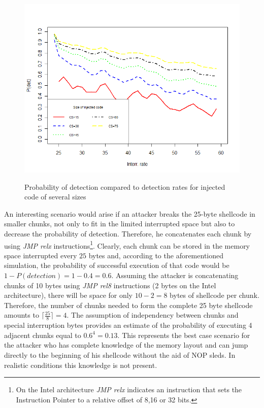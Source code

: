\begin{figure}[htbp] 
\begin{center}
\includegraphics[scale=0.5]{images/bubble_det_intrate}
\caption{{Probability of detection compared to detection rates for injected code of several sizes}}
\vspace{0.3cm}
\label{det_intrate}
\end{center}
\end{figure}



An interesting scenario would arise if an attacker breaks the 25-byte shellcode in smaller chunks, not only to fit in the limited interrupted space but also to decrease the probability of detection. Therefore, he concatenates each chunk by using \emph{JMP relx} instructions\footnote{On the Intel architecture \emph{JMP relx} indicates an instruction that sets the Instruction Pointer to a relative offset of 8,16 or 32 bits.}. 
Clearly, each chunk can be stored in the memory space interrupted every $25$ bytes and, according to the aforementioned simulation, the probability of successful execution of that code would be $1 - P(detection) = 1 - 0.4 = 0.6$. 
Assuming the attacker is concatenating chunks of 10 bytes using \emph{JMP rel8} instructions (2 bytes on the Intel architecture), there will be space for only $10-2 = 8$ bytes of shellcode per chunk. Therefore, the number of chunks needed to form the complete 25 byte shellcode amounts to $\lceil \frac{25}{8} \rceil = 4$. 
The assumption of independency between chunks and special interruption bytes provides an estimate of the probability of executing 4 adjacent chunks equal to $0.6^4 = 0.13$.  This represents the best case scenario for the attacker who has complete knowledge of the memory layout and can jump directly to the beginning of his shellcode without the aid of NOP sleds. In realistic conditions this knowledge is not present.

